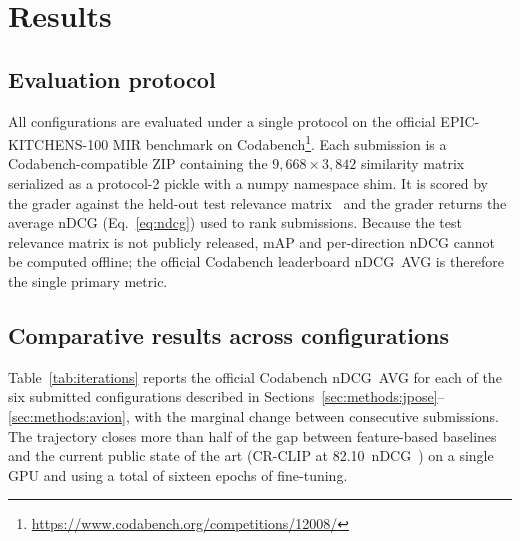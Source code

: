 \section{Results}
\label{sec:results}

\subsection{Evaluation protocol}
\label{sec:results:protocol}

All configurations are evaluated under a single protocol on the official EPIC-KITCHENS-100 MIR benchmark on Codabench\footnote{\url{https://www.codabench.org/competitions/12008/}}. Each submission is a Codabench-compatible ZIP containing the $9{,}668\times 3{,}842$ similarity matrix serialized as a protocol-2 pickle with a numpy namespace shim. It is scored by the grader against the held-out test relevance matrix~\cite{wray2021semantic} and the grader returns the average nDCG (Eq.~\ref{eq:ndcg}) used to rank submissions. Because the test relevance matrix is not publicly released, mAP and per-direction nDCG cannot be computed offline; the official Codabench leaderboard nDCG~AVG is therefore the single primary metric.

\subsection{Comparative results across configurations}
\label{sec:results:main}

Table~\ref{tab:iterations} reports the official Codabench nDCG~AVG for each of the six submitted configurations described in Sections~\ref{sec:methods:jpose}--\ref{sec:methods:avion}, with the marginal change between consecutive submissions. The trajectory closes more than half of the gap between feature-based baselines and the current public state of the art (CR-CLIP at 82.10~nDCG~\cite{he2025crclip}) on a single GPU and using a total of sixteen epochs of fine-tuning.

